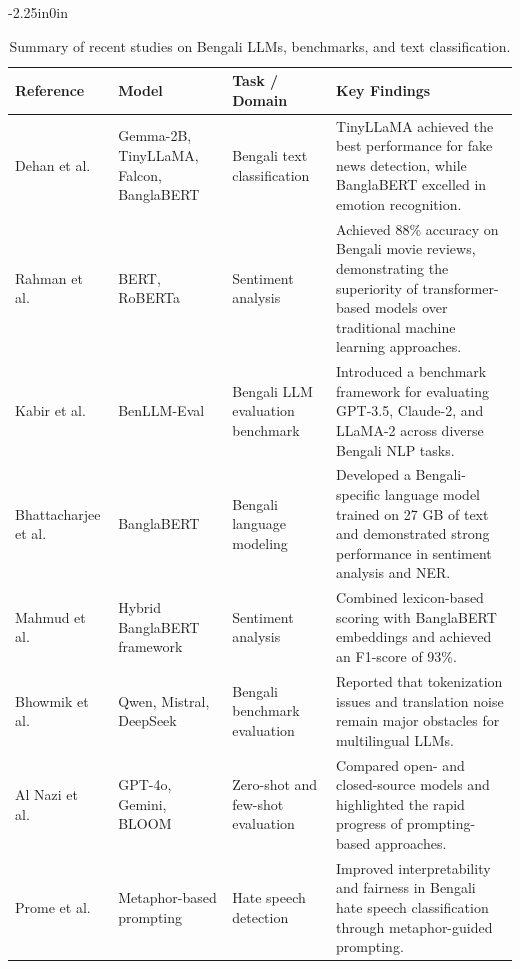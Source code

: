 \documentclass[10pt,letterpaper]{article}
\begin{document}
\begin{table}[!t]
\begin{adjustwidth}{-2.25in}{0in}
\centering
\caption{Summary of recent studies on Bengali LLMs, benchmarks, and text classification.}
\label{tab:bangla_llm_progress}
\small
\renewcommand{\arraystretch}{1.08}
\setlength{\tabcolsep}{4pt}
\begin{tabular}{|>{\raggedright\arraybackslash}p{3cm}|>{\raggedright\arraybackslash}p{3.0cm}|>{\raggedright\arraybackslash}p{3.0cm}|>{\raggedright\arraybackslash}p{8.1cm}|}
\hline
\textbf{Reference} & \textbf{Model} & \textbf{Task / Domain} & \textbf{Key Findings} \\
\hline
Dehan et al.~\cite{b1} & Gemma-2B, TinyLLaMA, Falcon, BanglaBERT & Bengali text classification & TinyLLaMA achieved the best performance for fake news detection, while BanglaBERT excelled in emotion recognition. \\
\hline
Rahman et al.~\cite{b2} & BERT, RoBERTa & Sentiment analysis & Achieved 88\% accuracy on Bengali movie reviews, demonstrating the superiority of transformer-based models over traditional machine learning approaches. \\
\hline
Kabir et al.~\cite{b3} & BenLLM-Eval & Bengali LLM evaluation benchmark & Introduced a benchmark framework for evaluating GPT-3.5, Claude-2, and LLaMA-2 across diverse Bengali NLP tasks. \\
\hline
Bhattacharjee et al.~\cite{b4} & BanglaBERT & Bengali language modeling & Developed a Bengali-specific language model trained on 27 GB of text and demonstrated strong performance in sentiment analysis and NER. \\
\hline
Mahmud et al.~\cite{b5} & Hybrid BanglaBERT framework & Sentiment analysis & Combined lexicon-based scoring with BanglaBERT embeddings and achieved an F1-score of 93\%. \\
\hline
Bhowmik et al.~\cite{b6} & Qwen, Mistral, DeepSeek & Bengali benchmark evaluation & Reported that tokenization issues and translation noise remain major obstacles for multilingual LLMs. \\
\hline
Al Nazi et al.~\cite{b7} & GPT-4o, Gemini, BLOOM & Zero-shot and few-shot evaluation & Compared open- and closed-source models and highlighted the rapid progress of prompting-based approaches. \\
\hline
Prome et al.~\cite{b8} & Metaphor-based prompting & Hate speech detection & Improved interpretability and fairness in Bengali hate speech classification through metaphor-guided prompting. \\

\end{tabular}
\end{adjustwidth}
\end{table}
\end{document}
